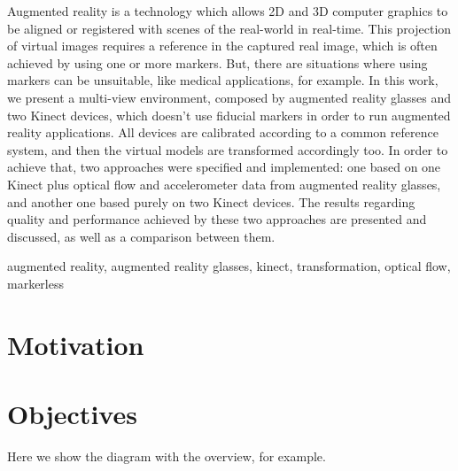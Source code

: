 \documentclass[msc, a4paper, classic, en]{ufbathesis}
\begin{document}
\abstract
Augmented reality is a technology which allows 2D and 3D computer graphics to be aligned or registered with scenes of the real-world in real-time. This projection of virtual images requires a reference in the captured real image, which is often achieved by using one or more markers. But, there are situations where using markers can be unsuitable, like medical applications, for example. In this work, we present a multi-view environment, composed by augmented reality glasses and two Kinect devices, which doesn't use fiducial markers in order to run augmented reality applications. All devices are calibrated according to a common reference system, and then the virtual models are transformed accordingly too. In order to achieve that, two approaches were specified and implemented: one based on one Kinect plus optical flow and accelerometer data from augmented reality glasses, and another one based purely on two Kinect devices. The results regarding quality and performance achieved by these two approaches are presented and discussed, as well as a comparison between them.
\begin{keywords}
augmented reality, augmented reality glasses, kinect, transformation, optical flow, markerless
\end{keywords}

\tableofcontents

\listoffigures

\listoftables

\mainmatter

% 
% 
% 
%

\section{Motivation}
\section{Objectives}
Here we show the diagram with the overview, for example.
\end{document}
